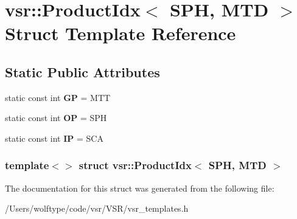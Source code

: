 \hypertarget{structvsr_1_1_product_idx_3_01_s_p_h_00_01_m_t_d_01_4}{\section{vsr\-:\-:Product\-Idx$<$ S\-P\-H, M\-T\-D $>$ Struct Template Reference}
\label{structvsr_1_1_product_idx_3_01_s_p_h_00_01_m_t_d_01_4}
}
\subsection*{Static Public Attributes}
\begin{DoxyCompactItemize}
\item 
\hypertarget{structvsr_1_1_product_idx_3_01_s_p_h_00_01_m_t_d_01_4_afb5e54dfbd24dd8e8a26f7de93a130cb}{static const int {\bfseries G\-P} = M\-T\-T}\label{structvsr_1_1_product_idx_3_01_s_p_h_00_01_m_t_d_01_4_afb5e54dfbd24dd8e8a26f7de93a130cb}

\item 
\hypertarget{structvsr_1_1_product_idx_3_01_s_p_h_00_01_m_t_d_01_4_a49d6af459b0c93f632d03e70b0298342}{static const int {\bfseries O\-P} = S\-P\-H}\label{structvsr_1_1_product_idx_3_01_s_p_h_00_01_m_t_d_01_4_a49d6af459b0c93f632d03e70b0298342}

\item 
\hypertarget{structvsr_1_1_product_idx_3_01_s_p_h_00_01_m_t_d_01_4_a9ed51343e3e2c135cf32fa45d42330d4}{static const int {\bfseries I\-P} = S\-C\-A}\label{structvsr_1_1_product_idx_3_01_s_p_h_00_01_m_t_d_01_4_a9ed51343e3e2c135cf32fa45d42330d4}

\end{DoxyCompactItemize}
\subsubsection*{template$<$$>$ struct vsr\-::\-Product\-Idx$<$ S\-P\-H, M\-T\-D $>$}



The documentation for this struct was generated from the following file\-:\begin{DoxyCompactItemize}
\item 
/\-Users/wolftype/code/vsr/\-V\-S\-R/vsr\-\_\-templates.\-h\end{DoxyCompactItemize}
